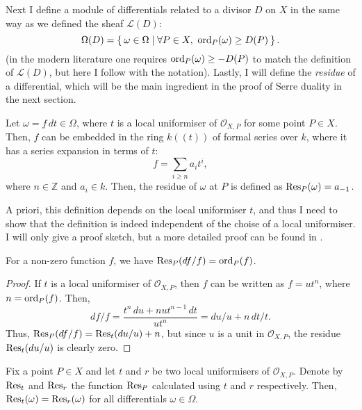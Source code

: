 Next I define a module of differentials related to a divisor $D$
on $X$ in the same way as we defined the sheaf $\mathcal{L}(D)$:
\[
  \Omega(D)=\Set{\omega\in\Omega\mid \forall P\in X,\ \operatorname{ord}_{P}(\omega)
  \geq D(P)}.
\]
(in the modern literature one requires $\operatorname{ord}_{P}(\omega)\geq -D(P)$
to match the definition of $\mathcal{L}(D)$, but here I follow \cite{serre}
with the notation). Lastly, I will define the \emph{residue} of a
differential, which will be the main ingredient in the proof of Serre
duality in the next section.
\begin{defin}
  Let $\omega=f\,dt\in\Omega$, where $t$ is a local uniformiser of
  $\mathscr{O}_{X,P}$ for some point $P\in X$. Then, $f$ can be embedded
  in the ring $k((t))$ of formal series over $k$, where it has a series
  expansion in terms of $t$:
  \[
    f=\sum_{i\geq n}a_{i}t^{i},
  \]
  where $n\in\mathbb{Z}$ and $a_{i}\in k$. Then, the residue of $\omega$
  at $P$ is defined as $\operatorname{Res}_{P}(\omega)=a_{-1}$.
\end{defin}
A priori, this definition depends on the local uniformiser $t$, and thus
I need to show that the definition is indeed independent of the choise
of a local uniformiser. I will only give a proof sketch, but a more detailed
proof can be found in \cite{serre}.
\begin{lemm}\label{lemm:res_quotient}
  For a non-zero function $f$, we have $\operatorname{Res}_{P}(df/f)=\operatorname{ord}_{P}(f)$.
\end{lemm}
\begin{proof}
  If $t$ is a local uniformiser of $\mathscr{O}_{X,P}$, then $f$ can be
  written as $f=ut^{n}$, where $n=\operatorname{ord}_{P}(f)$. Then,
  \[
    df/f = \frac{t^{n}\,du + nut^{n-1}\,dt}{ut^{n}}=du/u+n\,dt/t.
  \]
  Thus, $\operatorname{Res}_{P}(df/f)=\operatorname{Res}_{t}(du/u)+n$, but since $u$ is a unit in
  $\mathscr{O}_{X,P}$, the residue $\operatorname{Res}_{t}(du/u)$ is clearly zero.
\end{proof}
\begin{prop}
  Fix a point $P\in X$ and let $t$ and $r$ be two local uniformisers of
  $\mathscr{O}_{X,P}$. Denote by $\operatorname{Res}_{t}$ and $\operatorname{Res}_{r}$ the function
  $\operatorname{Res}_{P}$ calculated using $t$ and $r$ respectively. Then,
  $\operatorname{Res}_{t}(\omega)=\operatorname{Res}_{r}(\omega)$ for all differentials $\omega\in\Omega$.
\end{prop}

